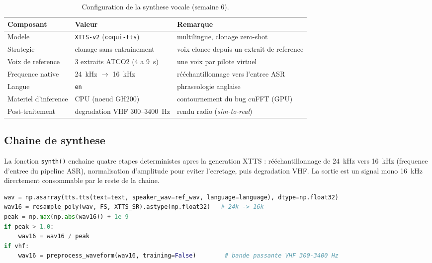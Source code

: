 \documentclass[11pt,a4paper]{article}
\begin{document}
\begin{table}[h]
\centering
\small
\begin{tabular}{>{\raggedright}p{4.3cm} >{\raggedright}p{4.3cm} p{5.0cm}}
\toprule
\rowcolor{lightgray}\textbf{Composant} & \textbf{Valeur} & \textbf{Remarque}\\
\midrule
Modele & \texttt{XTTS-v2} (\texttt{coqui-tts}) & multilingue, clonage zero-shot\\
Strategie & clonage sans entrainement & voix clonee depuis un extrait de reference\\
Voix de reference & 3 extraits ATCO2 (4 a 9~s) & une voix par pilote virtuel\\
Frequence native & 24~kHz $\rightarrow$ 16~kHz & rééchantillonnage vers l'entree ASR\\
Langue & \texttt{en} & phraseologie anglaise\\
Materiel d'inference & CPU (noeud GH200) & contournement du bug cuFFT (GPU)\\
Post-traitement & degradation VHF 300--3400~Hz & rendu radio (\emph{sim-to-real})\\
\bottomrule
\end{tabular}
\caption{Configuration de la synthese vocale (semaine 6).}
\end{table}

\subsection{Chaine de synthese}

La fonction \texttt{synth()} enchaine quatre etapes deterministes apres la generation
XTTS : rééchantillonnage de 24~kHz vers 16~kHz (frequence d'entree du pipeline ASR),
normalisation d'amplitude pour eviter l'ecretage, puis degradation VHF. La sortie est
un signal mono 16~kHz directement consommable par le reste de la chaine.

\begin{center}
\end{center}

\begin{lstlisting}[language=Python, caption={Coeur de la synthese : clonage XTTS puis post-traitement (extrait de \texttt{tts\_atc.py}).}]
wav = np.asarray(tts.tts(text=text, speaker_wav=ref_wav, language=language), dtype=np.float32)
wav16 = resample_poly(wav, FS, XTTS_SR).astype(np.float32)   # 24k -> 16k
peak = np.max(np.abs(wav16)) + 1e-9
if peak > 1.0:
    wav16 = wav16 / peak
if vhf:
    wav16 = preprocess_waveform(wav16, training=False)        # bande passante VHF 300-3400 Hz
\end{lstlisting}
\end{document}
